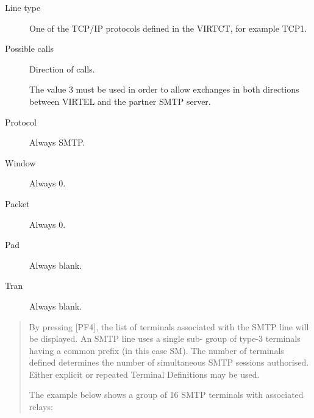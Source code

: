 \documentclass[letterpaper,10pt,english]{sphinxmanual}
\begin{document}
\begin{description}
\item[{Line type}] \leavevmode
One of the TCP/IP protocols defined in the VIRTCT, for example TCP1.

\item[{Possible calls}] \leavevmode
Direction of calls.

The value 3 must be used in order to allow exchanges in both directions between VIRTEL and the partner SMTP server.

\item[{Protocol}] \leavevmode
Always SMTP.

\item[{Window}] \leavevmode
Always 0.

\item[{Packet}] \leavevmode
Always 0.

\item[{Pad}] \leavevmode
Always blank.

\item[{Tran}] \leavevmode
Always blank.

\end{description}

\begin{quote}

By pressing {[}PF4{]}, the list of terminals associated with the SMTP line will be displayed. An SMTP line uses a single sub- group of type-3 terminals having a common prefix (in this case SM). The number of terminals defined determines the number of simultaneous SMTP sessions authorised. Either explicit or repeated Terminal Definitions may be used.

The example below shows a group of 16 SMTP terminals with associated relays:
\end{quote}


\end{document}
